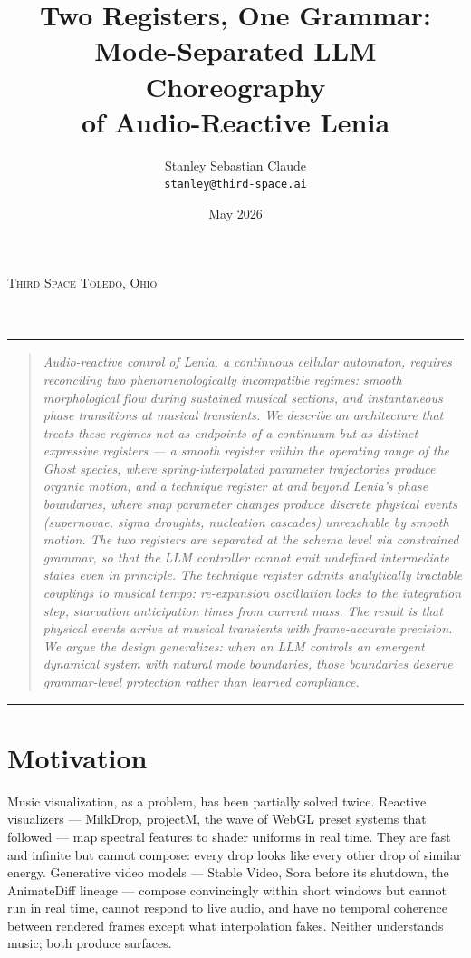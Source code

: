 \documentclass[11pt]{article}
\title{Two Registers, One Grammar:\\[0.2em]
{\large Mode-Separated LLM Choreography\\of Audio-Reactive Lenia}}
\author{Stanley Sebastian \quad\textbullet\quad Claude\\
\small\texttt{stanley@third-space.ai}}
\date{May 2026}
\makeatletter
\renewcommand{\maketitle}{%
  \begin{center}
    {\footnotesize\scshape\textcolor{black!55}{Third Space \quad\textbullet\quad Toledo, Ohio}}\\[1.6em]
    {\Large\itshape \@title}\\[1.0em]
    {\normalsize \@author}\\[0.5em]
    {\footnotesize\textcolor{black!55}{\@date}}
  \end{center}
  \vspace{1em}
  \rule{\textwidth}{0.3pt}
  \vspace{0.6em}
}
\makeatother
\begin{document}
\maketitle

\begin{quote}
\small\itshape
Audio-reactive control of Lenia, a continuous cellular automaton, requires
reconciling two phenomenologically incompatible regimes: smooth morphological
flow during sustained musical sections, and instantaneous phase transitions at
musical transients. We describe an architecture that treats these regimes not
as endpoints of a continuum but as distinct expressive registers --- a
\emph{smooth register} within the operating range of the Ghost species, where
spring-interpolated parameter trajectories produce organic motion, and a
\emph{technique register} at and beyond Lenia's phase boundaries, where snap
parameter changes produce discrete physical events (supernovae, sigma droughts,
nucleation cascades) unreachable by smooth motion. The two registers are
separated at the schema level via constrained grammar, so that the LLM
controller cannot emit undefined intermediate states even in principle. The
technique register admits analytically tractable couplings to musical tempo:
re-expansion oscillation locks to the integration step, starvation
anticipation times from current mass. The result is that physical events
arrive at musical transients with frame-accurate precision. We argue the
design generalizes: when an LLM controls an emergent dynamical system with
natural mode boundaries, those boundaries deserve grammar-level protection
rather than learned compliance.
\end{quote}

\vspace{0.5em}
\rule{\textwidth}{0.3pt}

\section{Motivation}

Music visualization, as a problem, has been partially solved twice. Reactive
visualizers --- MilkDrop, projectM, the wave of WebGL preset systems that
followed --- map spectral features to shader uniforms in real time. They are
fast and infinite but cannot compose: every drop looks like every other drop
of similar energy. Generative video models --- Stable Video, Sora before its
shutdown, the AnimateDiff lineage --- compose convincingly within short
windows but cannot run in real time, cannot respond to live audio, and have
no temporal coherence between rendered frames except what interpolation
fakes. Neither understands music; both produce surfaces.
\end{document}
